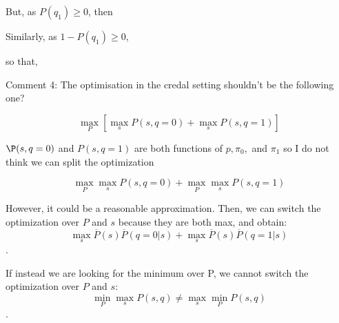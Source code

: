 \documentclass[runningheads]{llncs}
\begin{document}
	
	But, as $P(q_1)\geq 0$, then
	
	Similarly, as $1-P(q_1)\geq 0$, 
	
	so that,
	
	
	Comment 4: The optimisation in the credal setting shouldn't be the following one?
	
	$$\max_P [\max_s P(s,q=0)+\max_s P(s,q=1)]$$ 
	
	$\P(s,q=0)$ and $P(s,q=1)$ are both functions of $p, \pi_0,$ and $\pi_1$ so I do not 
	think we can split the optimization
	
	$$\max_P \max_s P(s,q=0)+\max_P\max_s P(s,q=1)$$ 
	
	However, it could be a reasonable approximation. Then, we can switch the optimization 
	over $P$ and $s$ because they are both max, and obtain: 
	$$\max_s \overline{P}(s)\overline{P}(q=0|s)+\max_s  \overline{P}(s)\overline{P}(q=1|s)$$.
	
	If instead we are looking for the minimum over P, we cannot switch the optimization 
	over $P$ and $s$:
	$$\min_P \max_s P(s,q) \neq \max_s \min_P P(s,q)$$.
	
\end{document}
